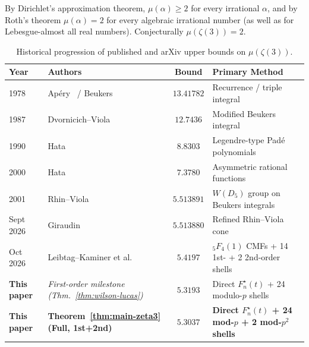 \documentclass[11pt,reqno]{amsart}
\theoremstyle{definition}
\theoremstyle{remark}
\begin{document}
By Dirichlet's approximation theorem, $\mu(\alpha) \ge 2$ for every irrational $\alpha$, and by Roth's theorem $\mu(\alpha) = 2$ for every algebraic irrational number (as well as for Lebesgue-almost all real numbers). Conjecturally $\mu(\zeta(3)) = 2$.

\begin{table}[ht]
\centering
\caption{Historical progression of published and arXiv upper bounds on $\mu(\zeta(3))$.}
\label{tab:history}
\footnotesize
\renewcommand{\arraystretch}{1.18}
\setlength{\tabcolsep}{4.5pt}
\begin{tabular}{@{}llcl@{}}
\toprule
Year & Authors & Bound & Primary Method \\
\midrule
1978 & Ap{\'e}ry~\cite{Apery1979} / Beukers~\cite{Beukers1979} & $13.41782$ & Recurrence / triple integral \\
1987 & Dvornicich--Viola~\cite{DvornicichViola1987} & $12.7436$ & Modified Beukers integral \\
1990 & Hata~\cite{Hata1990} & $8.8303$ & Legendre-type Pad{\'e} polynomials \\
2000 & Hata~\cite{Hata2000} & $7.3780$ & Asymmetric rational functions \\
2001 & Rhin--Viola~\cite{RhinViola2001} & $5.513891$ & $W(D_5)$ group on Beukers integrals \\
Sept 2026 & Giraudin~\cite{Giraudin2026} & $5.513880$ & Refined Rhin--Viola cone \\
Oct 2026 & Leibtag--Kaminer et al.~\cite{LeibtagKaminer2026} & $5.4197$ & ${}_5F_4(1)$ CMFs + 14 1st- + 2 2nd-order shells \\
\midrule
\textbf{This paper} & \emph{First-order milestone (Thm.~\ref{thm:wilson-lucas})} & $5.3193$ & Direct $F_n^{\star}(t)$ + 24 modulo-$p$ shells \\
\textbf{This paper} & \textbf{Theorem~\ref{thm:main-zeta3} (Full, 1st+2nd)} & $\mathbf{5.3037}$ & \textbf{Direct $F_n^{\star}(t)$ + 24 mod-$p$ + 2 mod-$p^2$ shells} \\
\bottomrule
\end{tabular}
\end{table}
\end{document}

